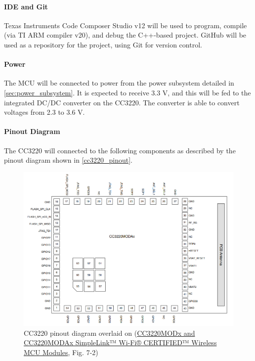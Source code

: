 \paragraph{IDE and Git}
Texas Instruments Code Composer Studio v12 will be used to program,
compile (via TI ARM compiler v20), and debug the C++-based project. GitHub
will be used as a repository for the project, using Git for version
control.

\paragraph{Power}
The MCU will be connected to power from the power subsystem detailed in 
\autoref{sec:power_subsystem}. It is expected to receive 3.3 V, and this will
be fed to the integrated DC/DC converter on the CC3220. The converter is able
to convert voltages from 2.3 to 3.6 V.

\paragraph{Pinout Diagram}
The CC3220 will connected to the following components as described by the
pinout diagram shown in \autoref{cc3220_pinout}.
\begin{figure}[H]
    \caption{CC3220 pinout diagram overlaid on (\href{https://www.ti.com/lit/ds/symlink/cc3220mod.pdf}{CC3220MODx and CC3220MODAx SimpleLink™ Wi-Fi® CERTIFIED™ Wireless MCU Modules}, Fig. 7-2)}
    \label{cc3220_pinout}
    \centering
    \includegraphics[width=\textwidth]{images/cc3220_pinout.png}
\end{figure}

